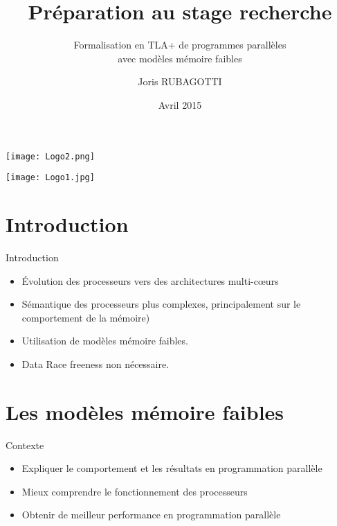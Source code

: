 \documentclass{beamer}
\title{Préparation au stage recherche}
\subtitle{Formalisation en TLA+ de programmes parallèles \\avec modèles mémoire faibles}
\author{Joris RUBAGOTTI}
\date{Avril 2015}
\begin{document}
\begin{frame}

\begin{minipage}[c]{.46\linewidth}
     \begin{center}
             \texttt{[image: Logo2.png]}
         \end{center}
   \end{minipage} \hfill
   \begin{minipage}[c]{.46\linewidth}
    \begin{center}
            \texttt{[image: Logo1.jpg]}
        \end{center}
 \end{minipage}

\maketitle

\end{frame}

\section{Introduction}
\begin{frame}{Introduction}
	\begin{itemize}
    	\item Évolution des processeurs vers des architectures multi-cœurs
    	\item Sémantique des processeurs plus complexes, principalement sur le comportement de la mémoire)
    	\item Utilisation de modèles mémoire faibles.
    	\item Data Race freeness non nécessaire.
    \end{itemize}
\end{frame}

\section{Les modèles mémoire faibles}
\begin{frame}{Contexte}
	\begin{itemize}
	\item Expliquer le comportement et les résultats en programmation parallèle
	\item Mieux comprendre le fonctionnement des processeurs
	\item Obtenir de meilleur performance en programmation parallèle
	\end{itemize}
\end{frame}
\end{document}
